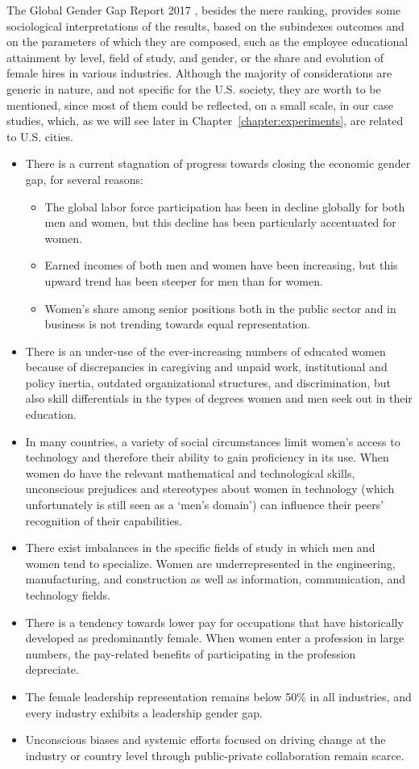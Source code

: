 The Global Gender Gap Report 2017 \cite{schwab2017global}, besides the mere ranking, provides some sociological interpretations of the results, based on the subindexes outcomes and on the parameters of which they are composed, such as the employee educational attainment by level, field of study, and gender, or the share and evolution of female hires in various industries. Although the majority of considerations are generic in nature, and not specific for the U.S. society, they are worth to be mentioned, since most of them could be reflected, on a small scale, in our case studies, which, as we will see later in Chapter~\ref{chapter:experiments}, are related to U.S. cities.
\begin{itemize}
\item There is a current stagnation of progress towards closing the economic gender gap, for several reasons:
\begin{itemize}
\item The global labor force participation has been in decline globally for both men and women, but this decline has been particularly accentuated for women.
\item Earned incomes of both men and women have been increasing, but this upward trend has been steeper for men than for women.
\item Women's share among senior positions both in the public sector and in business is not trending towards equal representation.
\end{itemize}
\item There is an under-use of the ever-increasing numbers of educated women because of discrepancies in caregiving and unpaid work, institutional and policy inertia, outdated organizational structures, and discrimination, but also skill differentials in the types of degrees women and men seek out in their education.
\item In many countries, a variety of social circumstances limit women's access to technology and therefore their ability to gain proficiency in its use. When women do have the relevant mathematical and technological skills, unconscious prejudices and stereotypes about women in technology (which unfortunately is still seen as a `men's domain') can influence their peers' recognition of their capabilities.
\item There exist imbalances in the specific fields of study in which men and women tend to specialize. Women are underrepresented in the engineering, manufacturing, and construction as well as information, communication, and technology fields.
\item There is a tendency towards lower pay for occupations that have historically developed as predominantly female. When women enter a profession in large numbers, the pay-related benefits of participating in the profession depreciate.
\item The female leadership representation remains below 50\% in all industries, and every industry exhibits a leadership gender gap.
\item Unconscious biases and systemic efforts focused on driving change at the industry or country level through public-private collaboration remain scarce.
\end{itemize}

